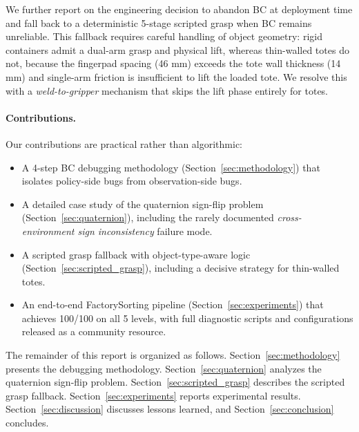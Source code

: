 We further report on the engineering decision to abandon BC at deployment time and fall back to a deterministic 5-stage scripted grasp when BC remains unreliable. This fallback requires careful handling of object geometry: rigid containers admit a dual-arm grasp and physical lift, whereas thin-walled totes do not, because the fingerpad spacing (46 mm) exceeds the tote wall thickness (14 mm) and single-arm friction is insufficient to lift the loaded tote. We resolve this with a \emph{weld-to-gripper} mechanism that skips the lift phase entirely for totes.

\paragraph{Contributions.} Our contributions are practical rather than algorithmic:
\begin{itemize}[leftmargin=*,itemsep=2pt]
    \item A 4-step BC debugging methodology (Section~\ref{sec:methodology}) that isolates policy-side bugs from observation-side bugs.
    \item A detailed case study of the quaternion sign-flip problem (Section~\ref{sec:quaternion}), including the rarely documented \emph{cross-environment sign inconsistency} failure mode.
    \item A scripted grasp fallback with object-type-aware logic (Section~\ref{sec:scripted_grasp}), including a decisive  strategy for thin-walled totes.
    \item An end-to-end FactorySorting pipeline (Section~\ref{sec:experiments}) that achieves 100/100 on all 5 levels, with full diagnostic scripts and configurations released as a community resource.
\end{itemize}

The remainder of this report is organized as follows. Section~\ref{sec:methodology} presents the debugging methodology. Section~\ref{sec:quaternion} analyzes the quaternion sign-flip problem. Section~\ref{sec:scripted_grasp} describes the scripted grasp fallback. Section~\ref{sec:experiments} reports experimental results. Section~\ref{sec:discussion} discusses lessons learned, and Section~\ref{sec:conclusion} concludes.
